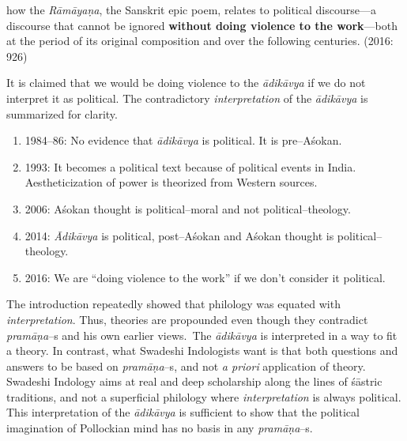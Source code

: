 \newpage

\begin{myquote}
how the \textit{Rāmāyaṇa}, the Sanskrit epic poem, relates to political discourse—a discourse that cannot be ignored \textbf{without doing violence to the work}—both at the period of its original composition and over the following centuries. (2016: 926)
\end{myquote}

It is claimed that we would be doing violence to the \textit{ādikāvya} if we do not interpret it as political. The contradictory \textit{interpretation} of the \textit{ādikāvya }is summarized for clarity.

\begin{enumerate}
\itemsep=0pt
\item 1984–86: No evidence that \textit{ādikāvya }is political. It is pre–Aśokan.

 \item 1993: It becomes a political text because of political events in India. Aestheticization of power is theorized from Western sources.

 \item 2006: Aśokan thought is political–moral and not political–theology.

 \item 2014: \textit{Ādikāvya }is political, post–Aśokan and Aśokan thought is political–theology.

 \item 2016: We are “doing violence to the work” if we don’t consider it political.

\end{enumerate}

The introduction repeatedly showed that philology was equated with \textit{interpretation}. Thus, theories are propounded even though they contradict \textit{pramāṇa}–s and his own earlier views.~The \textit{ādikāvya} is interpreted in a way to fit a theory. In contrast, what Swadeshi Indologists want is that both questions and answers to be based on \textit{pramāṇa}–s, and not \textit{a priori} application of theory. Swadeshi Indology aims at real and deep scholarship along the lines of śāstric traditions, and not a superficial philology where \textit{interpretation} is always political. This interpretation of the \textit{ādikāvya }is sufficient to show that the political imagination of Pollockian mind has no basis in any \textit{pramāṇa}–s.

